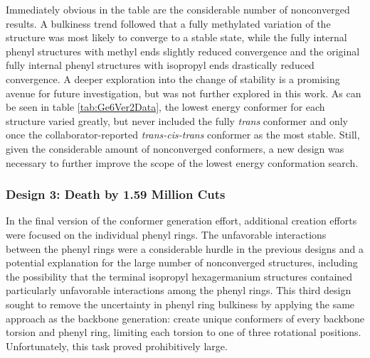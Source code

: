Immediately obvious in the table are the considerable number of nonconverged results. 
A bulkiness trend followed that a fully methylated variation of the structure was most likely to converge to a stable state, while the fully internal phenyl structures with methyl ends slightly reduced convergence and the original fully internal phenyl structures with isopropyl ends drastically reduced convergence.
A deeper exploration into the change of stability is a promising avenue for future investigation, but was not further explored in this work.
As can be seen in table \ref{tab:Ge6Ver2Data}, the lowest energy conformer for each structure varied greatly, but never included the fully \textit{trans} conformer and only once the collaborator-reported \textit{trans-cis-trans} conformer as the most stable.
Still, given the considerable amount of nonconverged conformers, a new design was necessary to further improve the scope of the lowest energy conformation search.

\subsubsection{Design 3: Death by 1.59 Million Cuts}

In the final version of the conformer generation effort, additional creation efforts were focused on the individual phenyl rings. 
The unfavorable interactions between the phenyl rings were a considerable hurdle in the previous designs and a potential explanation for the large number of nonconverged structures, including the possibility that the terminal isopropyl hexagermanium structures contained particularly unfavorable interactions among the phenyl rings.
This third design sought to remove the uncertainty in phenyl ring bulkiness by applying the same approach as the backbone generation: create unique conformers of every backbone torsion and phenyl ring, limiting each torsion to one of three rotational positions. 
Unfortunately, this task proved prohibitively large.

